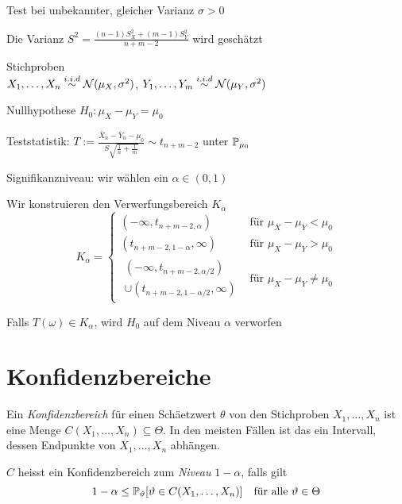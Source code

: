 \begin{definition}[ungepaart] Test bei unbekannter, gleicher Varianz \(\sigma > 0\)

	Die Varianz \(S^2 = \frac{ (n-1)S_X^2 + (m-1)S_Y^2 }{ n + m - 2}\) wird geschätzt
	\begin{compactenum}
		\item Stichproben \\
		\(X_1, \ldots, X_n \iid \Stdev(\mu_X,\sigma^2)\), \quad
		\(Y_1, \ldots, Y_m \iid \Stdev(\mu_Y,\sigma^2)\)
		\item Nullhypothese \(H_0: \mu_X - \mu_Y = \mu_0\)
		\item Teststatistik: \( T := \frac{ \overline{X}_n - \overline{Y}_n - \mu_0 }
		{S \sqrt{ \frac{1}{n} + \frac{1}{m} }} \sim t_{n+m-2}\) unter \(\P_{\mu_0}\)
		\item Signifikanzniveau: wir wählen ein \(\alpha \in (0,1)\)
		\item Wir konstruieren den Verwerfungsbereich \(K_\alpha\)
		\[
			K_\alpha
			=	\left\{\begin{array}{cl}
				(-\infty, t_{n+m-2,\alpha})  & \text{für } \mu_X - \mu_Y < \mu_0    \\
				(t_{n+m-2,1-\alpha}, \infty) & \text{für } \mu_X - \mu_Y > \mu_0    \\
				\left.
				\begin{array}{r}
					(-\infty, t_{n+m-2,\alpha/2}) \\
					\cup (t_{n+m-2,1-\alpha/2}, \infty)
				\end{array}
				\right.
				                             & \text{für } \mu_X - \mu_Y \neq \mu_0
			\end{array}\right.
		\]
		\item Falls \(T(\omega) \in K_\alpha\), wird \(H_0\) auf dem Niveau \(\alpha\) verworfen
	\end{compactenum}
\end{definition}




\section{Konfidenzbereiche}

\begin{definition}[Konfidenzbereich]
	Ein \emph{Konfidenzbereich} für einen Schäetzwert \(\theta\) von den Stichproben \(X_1,\ldots,X_n\)
	ist eine Menge \(C(X_1,\ldots,X_n) \subseteq \Theta\).
	In den meisten Fällen ist das ein Intervall, dessen Endpunkte von \(X_1,\ldots,X_n\) abhängen.

	\(C\) heisst ein Konfidenzbereich zum \emph{Niveau} \(1-\alpha\), falls gilt
	\[	1 - \alpha \leq \P_\theta[\theta \in C(X_1,\ldots,X_n)] \quad \text{für alle } \theta \in \Theta\]
\end{definition}


